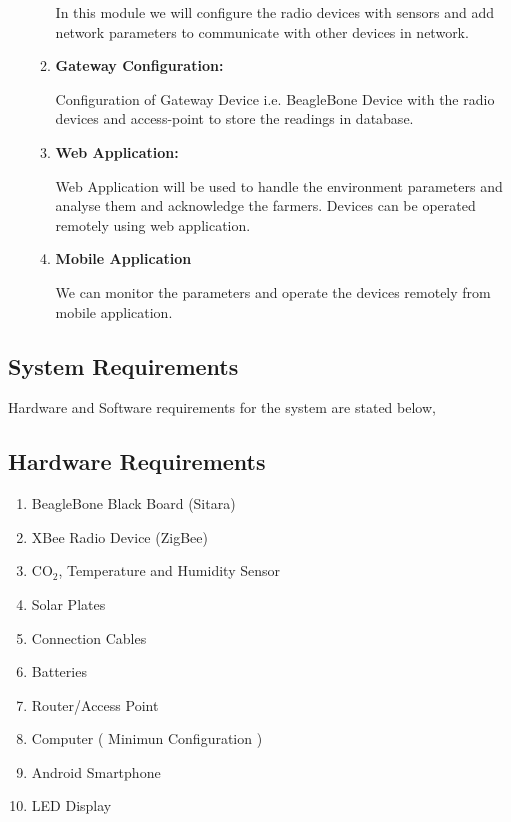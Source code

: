 \documentclass[10pt,a4paper]{article}
\begin{document}
\begin{itemize}
\begin{enumerate}
\quad
In this module we will configure the radio devices with sensors and add network parameters to communicate with other devices in network.

\item \textbf{Gateway Configuration:}

\quad
	Configuration of Gateway Device i.e. BeagleBone Device with the radio devices and access-point to store the readings in database.

\item \textbf{Web Application:}

\quad
	Web Application will be used to handle the environment parameters and analyse them and acknowledge the farmers. Devices can be operated remotely using web application.

\item \textbf{Mobile Application}

\quad
	We can monitor the parameters and operate the devices remotely from mobile application.

\end{enumerate}
\end{itemize}
\begin{large}
\section{System Requirements}
\end{large}
Hardware and Software requirements for the system are stated below,
\begin{large}
\subsection{Hardware Requirements}
\end{large}
\begin{enumerate}
\item BeagleBone Black Board (Sitara)
\item XBee Radio Device (ZigBee)
\item CO\ensuremath{_2}, Temperature and Humidity Sensor
\item Solar Plates
\item Connection Cables 
\item Batteries
\item Router/Access Point
\item Computer ( Minimun Configuration )
\item Android Smartphone
\item LED Display

\end{enumerate}
\end{document}
